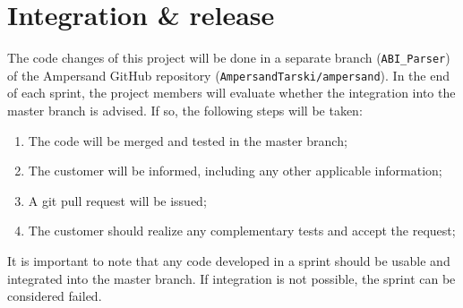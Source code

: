 
\section{Integration \& release}
\label{sec:integration-release}
%
%
The code changes of this project will be done in a separate branch (\texttt{ABI\_Parser}) of the Ampersand GitHub repository (\texttt{AmpersandTarski/ampersand}).
In the end of each sprint, the project members will evaluate whether the integration into the master branch is advised.
If so, the following steps will be taken:
\begin{enumerate}
	\item The code will be merged and tested in the master branch;
	\item The customer will be informed, including any other applicable information;
	\item A git pull request will be issued;
	\item The customer should realize any complementary tests and accept the request;
\end{enumerate}
%
It is important to note that any code developed in a sprint should be usable and integrated into the master branch.
If integration is not possible, the sprint can be considered failed.